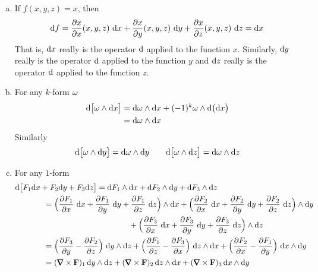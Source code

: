 \begin{eg}\label{eg:diffFormDiff}
\begin{enumerate}[(a)]

\item %
If $f(x,y,z) = x$, then
\begin{equation*}
\mathrm{d}f
=\frac{\partial x}{\partial x}(x,y,z)\ \mathrm{d}x
+\frac{\partial x}{\partial y}(x,y,z)\ \mathrm{d}y
+\frac{\partial x}{\partial z}(x,y,z)\ \mathrm{d}z 
=\mathrm{d}x
\end{equation*}
That is, $\mathrm{d}x$ really is the operator $\mathrm{d}$ applied to the 
function $x$. Similarly, $\mathrm{d}y$ really is the operator $\mathrm{d}$ 
applied to the function $y$ and $\mathrm{d}z$ really is the operator 
$\mathrm{d}$ applied to the function $z$.

\item  %
For any $k$-form $\omega$
\begin{align*}
\mathrm{d}\big[\omega\wedge\mathrm{d}x\big]
&=\mathrm{d}\omega\wedge\mathrm{d}x + (-1)^k\omega\wedge\mathrm{d}\big(\mathrm{d}x\big) \\
&=\mathrm{d}\omega\wedge\mathrm{d}x
\end{align*}
Similarly
\begin{equation*}
\mathrm{d}\big[\omega\wedge\mathrm{d}y\big]=\mathrm{d}\omega\wedge\mathrm{d}y\qquad
\mathrm{d}\big[\omega\wedge\mathrm{d}z\big]=\mathrm{d}\omega\wedge\mathrm{d}z
\end{equation*}

\item %
For any $1$-form
\begin{align*}
&\dee{}\big[F_1\dee{x} + F_2\dee{y} + F_3\dee{z}\big]
=\dee{F_1}\wedge\dee{x} + \dee{F_2}\wedge\dee{y}  + \dee{F_3}\wedge\dee{z}
\\
&\hskip0.5in=\Big(\frac{\partial F_1}{\partial x}\ \dee{x}
      +\frac{\partial F_1}{\partial y}\ \dee{y}
      +\frac{\partial F_1}{\partial z}\ \dee{z}\Big)\wedge\dee{x}
+\Big(\frac{\partial F_2}{\partial x}\ \dee{x}
      +\frac{\partial F_2}{\partial y}\ \dee{y}
      +\frac{\partial F_2}{\partial z}\ \dee{z}\Big)\wedge\dee{y}
   \\&\hskip2in
+\Big(\frac{\partial F_3}{\partial x}\ \dee{x}
      +\frac{\partial F_3}{\partial y}\ \dee{y}
      +\frac{\partial F_3}{\partial z}\ \dee{z}\Big)\wedge\dee{z}
\\
&\hskip0.5in=
  \Big(\frac{\partial F_3}{\partial y}-\frac{\partial F_2}{\partial z}\Big)
          \ \dee{y}\wedge\dee{z}
   +\Big(\frac{\partial F_1}{\partial z}-\frac{\partial F_3}{\partial x}\Big)
          \ \dee{z}\wedge\dee{x}
   +\Big(\frac{\partial F_2}{\partial x}-\frac{\partial F_1}{\partial y}\Big)
          \ \dee{x}\wedge\dee{y}
\\
&\hskip0.5in=
   (\vnabla\times\vF)_1\,\dee{y}\wedge\dee{z}
   +(\vnabla\times\vF)_2\,\dee{z}\wedge\dee{x}
   +(\vnabla\times\vF)_3\,\dee{x}\wedge\dee{y}
\end{align*}


\end{enumerate}
\end{eg}
